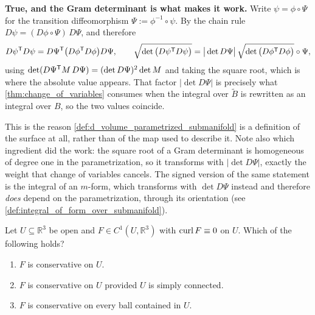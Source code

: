 \begin{answer}
\textbf{True, and the Gram determinant is what makes it work.} Write $\psi = \phi\circ\Psi$ for
the transition diffeomorphism $\Psi := \phi^{-1}\circ\psi$. By the chain rule
$D\psi = (D\phi\circ\Psi)\,D\Psi$, and therefore
\[D\psi^{\mathsf{T}} D\psi = D\Psi^{\mathsf{T}}\big(D\phi^{\mathsf{T}} D\phi\big)D\Psi,
  \qquad
  \sqrt{\det\big(D\psi^{\mathsf{T}} D\psi\big)}
    = \big\lvert\det D\Psi\big\rvert\,\sqrt{\det\big(D\phi^{\mathsf{T}} D\phi\big)}\circ\Psi,\]
using $\det(D\Psi^{\mathsf{T}} M\,D\Psi) = (\det D\Psi)^2\det M$ and taking the square root, which is
where the absolute value appears. That factor $\lvert\det D\Psi\rvert$ is precisely what
\cref{thm:change_of_variables} consumes when the integral over $\widetilde B$ is rewritten as an
integral over $B$, so the two values coincide.
\end{answer}

\begin{ainote}
This is the reason \cref{def:d_volume_parametrized_submanifold} is a definition of the surface at
all, rather than of the map used to describe it. Note also which ingredient did the work: the
square root of a Gram determinant is homogeneous of degree one in the parametrization, so it
transforms with $\lvert\det D\Psi\rvert$, exactly the weight that change of variables cancels.
The signed version of the same statement is the integral of an $m$-form, which transforms with
$\det D\Psi$ instead and therefore \emph{does} depend on the parametrization, through its
orientation (see \cref{def:integral_of_form_over_submanifold}).
\end{ainote}

\begin{question}
\label{q:quiz_q11}
Let $U \subseteq \mathbb{R}^3$ be open and $F \in C^1(U,\mathbb{R}^3)$ with $\operatorname{curl} F \equiv 0$
on $U$. Which of the following holds?
\begin{enumerate}[label=\textbf{(\alph*)}]
  \item $F$ is conservative on $U$.
  \item $F$ is conservative on $U$ provided $U$ is simply connected.
  \item $F$ is conservative on every ball contained in $U$.
\end{enumerate}
\end{question}

